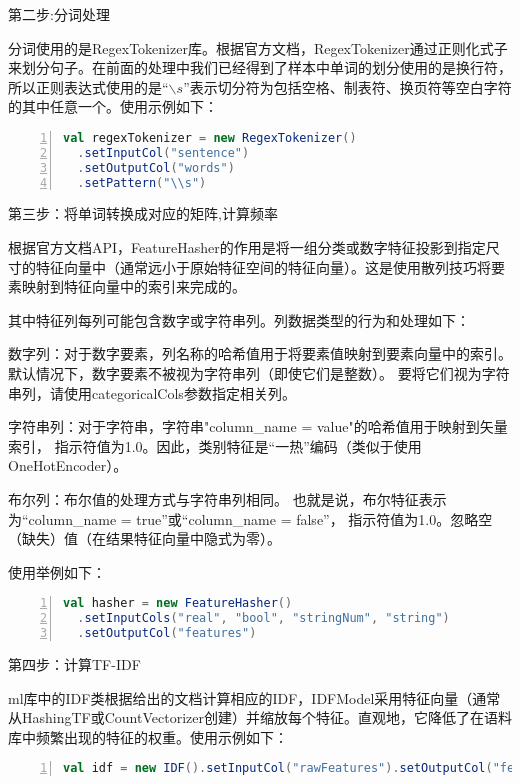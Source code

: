 \documentclass[lang=cn,11pt]{elegantpaper}
\begin{document}
第二步:分词处理

分词使用的是RegexTokenizer库。根据官方文档，RegexTokenizer通过正则化式子来划分句子。在前面的处理中我们已经得到了样本中单词的划分使用的是换行符，所以正则表达式使用的是“$\backslash s$”表示切分符为包括空格、制表符、换页符等空白字符的其中任意一个。使用示例如下：
\begin{lstlisting}[language={Scala},numbers=left,numberstyle=\tiny,%frame=shadowbox,  
  rulesepcolor=\color{red!20!green!20!blue!20},  
  keywordstyle=\color{blue!70!black},  
  commentstyle=\color{blue!90!},  
  basicstyle=\ttfamily]  
val regexTokenizer = new RegexTokenizer()
  .setInputCol("sentence")
  .setOutputCol("words")
  .setPattern("\\s")
\end{lstlisting}\par

第三步：将单词转换成对应的矩阵,计算频率

根据官方文档API，FeatureHasher的作用是将一组分类或数字特征投影到指定尺寸的特征向量中（通常远小于原始特征空间的特征向量）。这是使用散列技巧将要素映射到特征向量中的索引来完成的。

其中特征列每列可能包含数字或字符串列。列数据类型的行为和处理如下：

数字列：对于数字要素，列名称的哈希值用于将要素值映射到要素向量中的索引。
默认情况下，数字要素不被视为字符串列（即使它们是整数）。
要将它们视为字符串列，请使用categoricalCols参数指定相关列。

字符串列：对于字符串，字符串"column\_name = value"的哈希值用于映射到矢量索引，
指示符值为1.0。因此，类别特征是“一热”编码（类似于使用OneHotEncoder）。

布尔列：布尔值的处理方式与字符串列相同。
也就是说，布尔特征表示为“column\_name = true”或“column\_name = false”，
指示符值为1.0。忽略空（缺失）值（在结果特征向量中隐式为零）。

使用举例如下：
\begin{lstlisting}[language={Scala},numbers=left,numberstyle=\tiny,%frame=shadowbox,  
  rulesepcolor=\color{red!20!green!20!blue!20},  
  keywordstyle=\color{blue!70!black},  
  commentstyle=\color{blue!90!},  
  basicstyle=\ttfamily]  
val hasher = new FeatureHasher()
  .setInputCols("real", "bool", "stringNum", "string")
  .setOutputCol("features")
\end{lstlisting}\par

第四步：计算TF-IDF

ml库中的IDF类根据给出的文档计算相应的IDF，IDFModel采用特征向量（通常从HashingTF或CountVectorizer创建）并缩放每个特征。直观地，它降低了在语料库中频繁出现的特征的权重。使用示例如下：
\begin{lstlisting}[language={Scala},numbers=left,numberstyle=\tiny,%frame=shadowbox,  
  rulesepcolor=\color{red!20!green!20!blue!20},  
  keywordstyle=\color{blue!70!black},  
  commentstyle=\color{blue!90!},  
  basicstyle=\ttfamily]  
val idf = new IDF().setInputCol("rawFeatures").setOutputCol("features")
\end{lstlisting}\par
\end{document}
